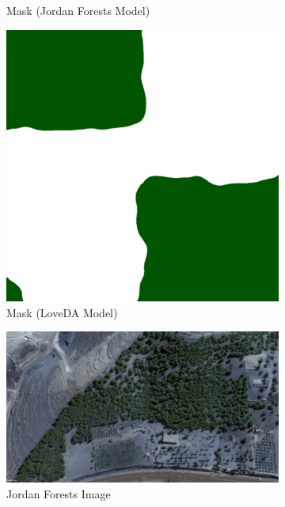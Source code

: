\begin{figure}[H]
\begin{subfigure}{0.32\textwidth}
    \caption{Mask (Jordan Forests Model)}
    \label{fig:img2}
\end{subfigure}
\hfill
\begin{subfigure}{0.32\textwidth}
    \centering
    \includegraphics[width=\textwidth]{IMAGENES/Result_Mask1_Lo.png}
    \caption{Mask (LoveDA Model)}
    \label{fig:img3}
\end{subfigure}
\begin{subfigure}{0.32\textwidth}
    \centering
    \includegraphics[width=\textwidth]{IMAGENES/Result_Img2.png}
    \caption{Jordan Forests Image}
    \label{fig:img1}
\end{subfigure}
\hfill
\begin{subfigure}{0.32\textwidth}

\end{subfigure}
\end{figure}

